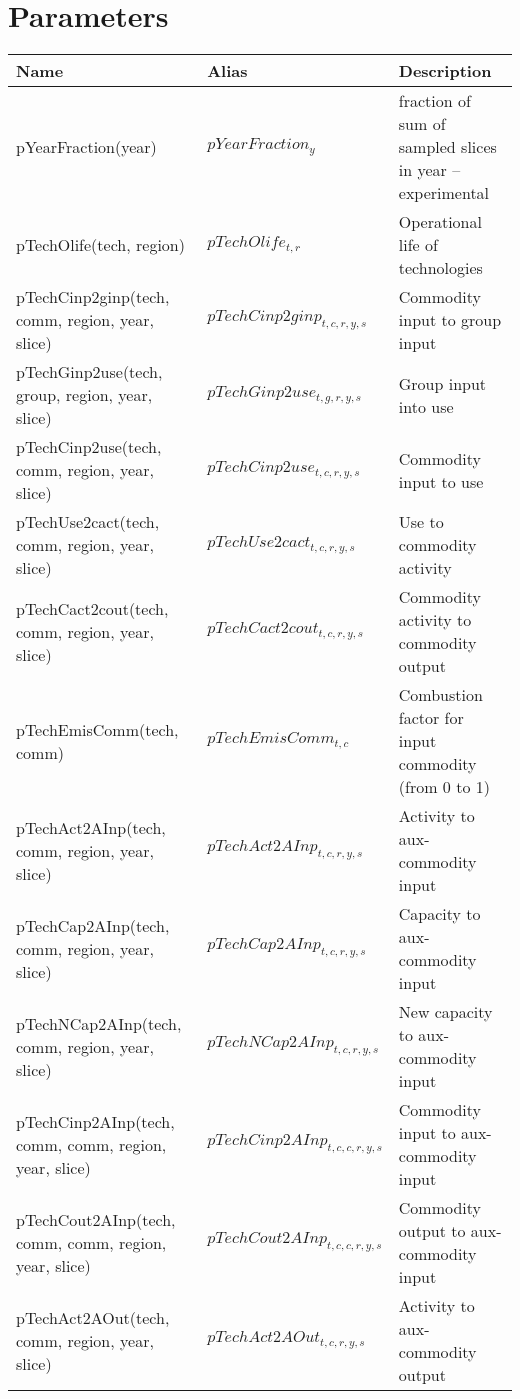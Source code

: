 \documentclass{article}
\begin{document}
\section*{Parameters}
\begin{longtable}{|p{10cm}|p{5cm}|p{9cm}|}
\hline
\bf{Name} & \bf{Alias}  & \bf{Description} \\
 \hline
pYearFraction(year) & $pYearFraction_{y}$ & fraction of sum of sampled slices in year -- experimental \\
 \hline
pTechOlife(tech, region) & $pTechOlife_{t,r}$ & Operational life of technologies \\
 \hline
pTechCinp2ginp(tech, comm, region, year, slice) & $pTechCinp2ginp_{t,c,r,y,s}$ & Commodity input to group input \\
 \hline
pTechGinp2use(tech, group, region, year, slice) & $pTechGinp2use_{t,g,r,y,s}$ & Group input into use \\
 \hline
pTechCinp2use(tech, comm, region, year, slice) & $pTechCinp2use_{t,c,r,y,s}$ & Commodity input to use \\
 \hline
pTechUse2cact(tech, comm, region, year, slice) & $pTechUse2cact_{t,c,r,y,s}$ & Use to commodity activity \\
 \hline
pTechCact2cout(tech, comm, region, year, slice) & $pTechCact2cout_{t,c,r,y,s}$ & Commodity activity to commodity output \\
 \hline
pTechEmisComm(tech, comm) & $pTechEmisComm_{t,c}$ & Combustion factor for input commodity (from 0 to 1) \\
 \hline
pTechAct2AInp(tech, comm, region, year, slice) & $pTechAct2AInp_{t,c,r,y,s}$ & Activity to aux-commodity input \\
 \hline
pTechCap2AInp(tech, comm, region, year, slice) & $pTechCap2AInp_{t,c,r,y,s}$ & Capacity to aux-commodity input \\
 \hline
pTechNCap2AInp(tech, comm, region, year, slice) & $pTechNCap2AInp_{t,c,r,y,s}$ & New capacity to aux-commodity input \\
 \hline
pTechCinp2AInp(tech, comm, comm, region, year, slice) & $pTechCinp2AInp_{t,c,c,r,y,s}$ & Commodity input to aux-commodity input \\
 \hline
pTechCout2AInp(tech, comm, comm, region, year, slice) & $pTechCout2AInp_{t,c,c,r,y,s}$ & Commodity output to aux-commodity input \\
 \hline
pTechAct2AOut(tech, comm, region, year, slice) & $pTechAct2AOut_{t,c,r,y,s}$ & Activity to aux-commodity output \\

\end{longtable}
\end{document}
